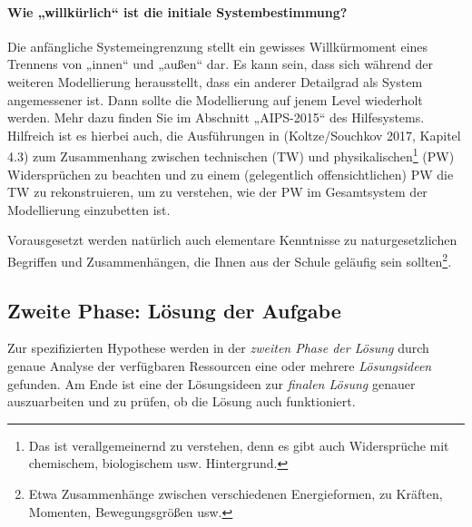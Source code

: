 \documentclass[11pt,a4paper]{article}
\begin{document}
\paragraph{Wie „willkürlich“ ist die initiale Systembestimmung?}
Die anfängliche Systemeingrenzung stellt ein gewisses Willkürmoment eines
Trennens von „innen“ und „außen“ dar.  Es kann sein, dass sich während der
weiteren Modellierung herausstellt, dass ein anderer Detailgrad als System
angemessener ist.  Dann sollte die Modellierung auf jenem Level wiederholt
werden.  Mehr dazu finden Sie im Abschnitt „AIPS-2015“ des Hilfesystems.
Hilfreich ist es hierbei auch, die Ausführungen in (Koltze/Souchkov 2017,
Kapitel 4.3) zum Zusammenhang zwischen technischen (TW) und
physikalischen\footnote{Das ist verallgemeinernd zu verstehen, denn es gibt
  auch Widersprüche mit chemischem, biologischem usw. Hintergrund.}  (PW)
Widersprüchen zu beachten und zu einem (gelegentlich offensichtlichen) PW die
TW zu rekonstruieren, um zu verstehen, wie der PW im Gesamtsystem der
Modellierung einzubetten ist.

Vorausgesetzt werden natürlich auch elementare Kenntnisse zu naturgesetzlichen
Begriffen und Zusammenhängen, die Ihnen aus der Schule geläufig sein
sollten\footnote{Etwa Zusammenhänge zwischen verschiedenen Energieformen, zu
  Kräften, Momenten, Bewegungsgrößen usw.}.

\subsection{Zweite Phase: Lösung der Aufgabe}

Zur spezifizierten Hypothese werden in der \emph{zweiten Phase der Lösung}
durch genaue Analyse der verfügbaren Ressourcen eine oder mehrere
\emph{Lösungsideen} gefunden. Am Ende ist eine der Lösungsideen zur
\emph{finalen Lösung} genauer auszuarbeiten und zu prüfen, ob die Lösung auch
funktioniert.
\end{document}
